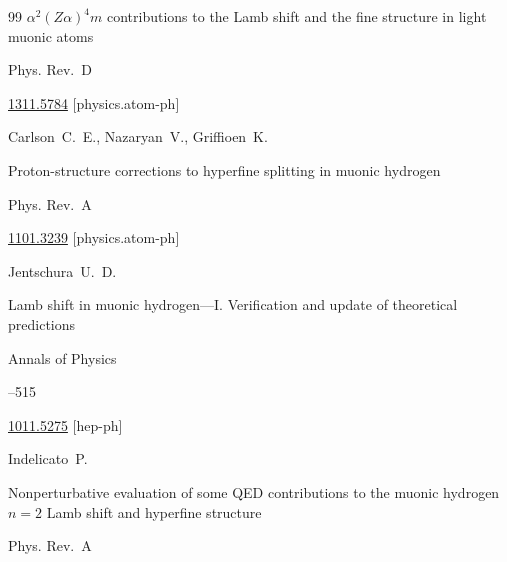 \begin{thebibliography}{99}
\paper $\alpha^2(Z\alpha)^4 m$ contributions to the Lamb shift and the fine structure in light muonic atoms

\jour Phys. Rev.~D






\arxiv \href{http://arxiv.org/abs/1311.5784}{1311.5784} [physics.atom-ph]




\by Carlson~C.~E., Nazaryan~V., Griffioen~K.

\paper Proton-structure corrections to hyperfine splitting in muonic hydrogen

\jour Phys. Rev.~A






\arxiv \href{http://arxiv.org/abs/1101.3239}{1101.3239} [physics.atom-ph]




\by Jentschura~U.~D.

\paper Lamb shift in muonic hydrogen—I. Verification and update of theoretical predictions

\jour Annals of Physics




--515


\arxiv \href{http://arxiv.org/abs/1011.5275}{1011.5275} [hep-ph]




\by Indelicato~P.

\paper Nonperturbative evaluation of some QED contributions to the muonic hydrogen $n=2$ Lamb shift and hyperfine structure

\jour Phys. Rev.~A




\end{thebibliography}
